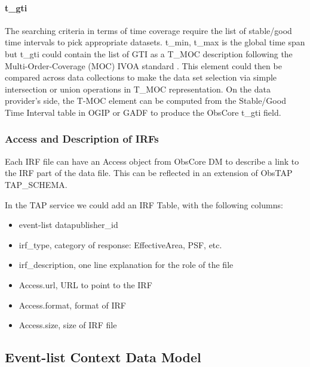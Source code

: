 \documentclass[11pt,a4paper]{ivoa}
\begin{document}


\paragraph{t\_gti}

The searching criteria in terms of time coverage require the list of stable/good time intervals to pick appropriate datasets.
t\_min, t\_max is the global time span but t\_gti could contain the list of GTI as a T\_MOC description following the Multi-Order-Coverage (MOC) IVOA standard \citep{2022ivoa.spec.0727F}.
This element could then be compared across data collections to make the data set selection via simple intersection or union operations in T\_MOC representation.
On the data provider's side, the T-MOC element can be computed from the Stable/Good Time Interval table in OGIP or GADF to produce the ObsCore t\_gti field.




\subsubsection{Access and Description of IRFs}

Each IRF file can have an Access object from ObsCore DM to describe a link to the IRF part of the data file.
This can be reflected in an extension of ObsTAP TAP\_SCHEMA.

In the TAP service we could add an IRF Table, with the following columns:

\begin{itemize}
    \item event-list datapublisher\_id
    \item irf\_type, category of response: EffectiveArea, PSF, etc.
    \item irf\_description, one line explanation for the role of the file
    \item Access.url, URL to point to the IRF
    \item Access.format, format of IRF
    \item Access.size, size of IRF file
\end{itemize}



\subsection{Event-list Context Data Model}
\label{sec:EventListContext}
\end{document}

